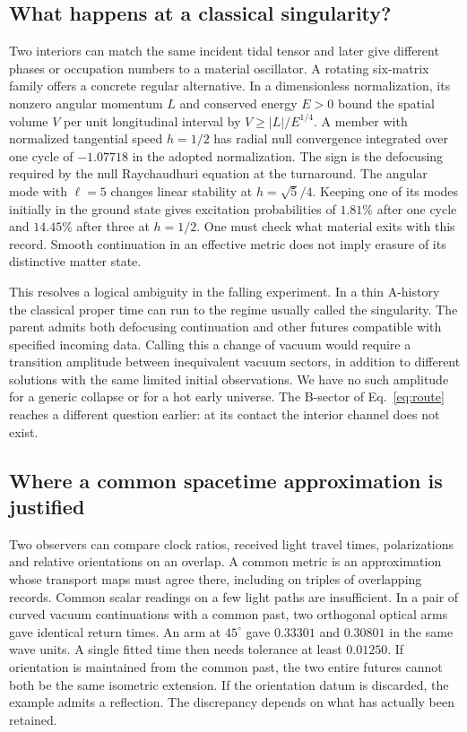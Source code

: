 \subsection{What happens at a classical singularity?}
Two interiors can match the same incident tidal tensor and later give different phases or occupation numbers to a material oscillator. A rotating six-matrix family offers a concrete regular alternative. In a dimensionless normalization, its nonzero angular momentum \(L\) and conserved energy \(E>0\) bound the spatial volume \(V\) per unit longitudinal interval by \(V\ge |L|/E^{1/4}\). A member with normalized tangential speed \(h=1/2\) has radial null convergence integrated over one cycle of \(-1.07718\) in the adopted normalization. The sign is the defocusing required by the null Raychaudhuri equation at the turnaround. The angular mode with \(\ell=5\) changes linear stability at \(h=\sqrt5/4\). Keeping one of its modes initially in the ground state gives excitation probabilities of \(1.81\%\) after one cycle and \(14.45\%\) after three at \(h=1/2\). One must check what material exits with this record. Smooth continuation in an effective metric does not imply erasure of its distinctive matter state.

This resolves a logical ambiguity in the falling experiment. In a thin A-history the classical proper time can run to the regime usually called the singularity. The parent admits both defocusing continuation and other futures compatible with specified incoming data. Calling this a change of vacuum would require a transition amplitude between inequivalent vacuum sectors, in addition to different solutions with the same limited initial observations. We have no such amplitude for a generic collapse or for a hot early universe. The B-sector of Eq.~\eqref{eq:route} reaches a different question earlier: at its contact the interior channel does not exist.

\subsection{Where a common spacetime approximation is justified}
Two observers can compare clock ratios, received light travel times, polarizations and relative orientations on an overlap. A common metric is an approximation whose transport maps must agree there, including on triples of overlapping records. Common scalar readings on a few light paths are insufficient. In a pair of curved vacuum continuations with a common past, two orthogonal optical arms gave identical return times. An arm at \(45^\circ\) gave \(0.33301\) and \(0.30801\) in the same wave units. A single fitted time then needs tolerance at least \(0.01250\). If orientation is maintained from the common past, the two entire futures cannot both be the same isometric extension. If the orientation datum is discarded, the example admits a reflection. The discrepancy depends on what has actually been retained.

